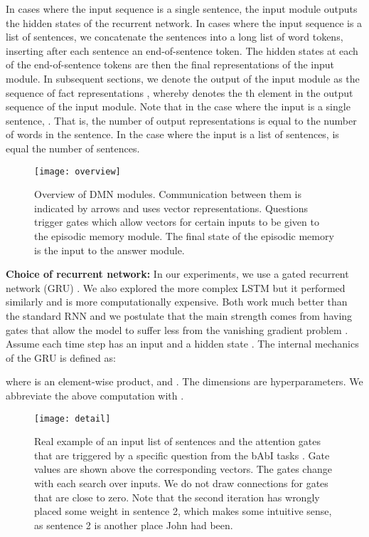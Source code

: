 \documentclass{article}
\begin{document}
In cases where the input sequence is a single sentence, the input module outputs the hidden states of the recurrent network. In cases where the input sequence is a list of sentences, we concatenate the sentences into a long list of word tokens, inserting after each sentence an end-of-sentence token. The hidden states at each of the end-of-sentence tokens are then the final representations of the input module. In subsequent sections, we denote the output of the input module as the sequence of  fact representations , whereby  denotes the th element in the output sequence of the input module. Note that in the case where the input is a single sentence, . That is, the number of output representations is equal to the number of words in the sentence. In the case where the input is a list of sentences,  is equal the number of sentences.

\begin{figure}[t!]
\centering
\texttt{[image: overview]}
\label{fig:DMN}
\caption{Overview of DMN modules. Communication between them is indicated by arrows and uses vector representations. Questions trigger gates which allow vectors for certain inputs to be given to the episodic memory module. The final state of the episodic memory is the input to the answer module.}
\vspace{-0.3cm}
\end{figure}

\textbf{Choice of recurrent network:}
In our experiments, we use a gated recurrent network (GRU) \cite{Cho2014,Chung2014}. We also explored the more complex LSTM \cite{Hochreiter1997} but it performed similarly and is more computationally expensive. Both work much better than the standard  RNN and we postulate that the main strength comes from having gates that allow the model to suffer less from the vanishing gradient problem \cite{Hochreiter1997}. Assume each time step  has an input  and a hidden state . The internal mechanics of the GRU is defined as:


where  is an element-wise product,  and . The dimensions  are hyperparameters. We abbreviate the above computation with .



\begin{figure*}[t!]
\texttt{[image: detail]}
\caption{Real example of an input list of sentences and the attention gates that are triggered by a specific question from the bAbI tasks \cite{Weston2015ToyTasks}. Gate values  are shown above the corresponding vectors. The gates change with each search over inputs. We do not draw connections for gates that are close to zero. Note that the second iteration has wrongly placed some weight in sentence 2, which makes some intuitive sense, as sentence 2 is another place John had been.}
\label{fig:ExampleDMN}
\end{figure*}
\end{document}
